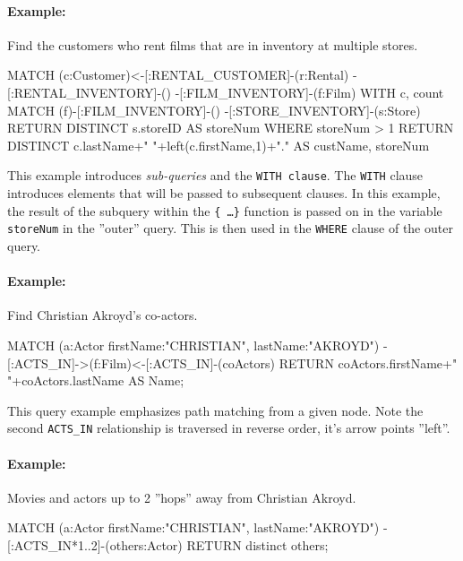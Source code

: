 \paragraph*{Example:} Find the customers who rent films that are in inventory at multiple stores.

\begin{samepage}
\begin{cyphercode}
MATCH (c:Customer)<-[:RENTAL_CUSTOMER]-(r:Rental)
       -[:RENTAL_INVENTORY]-()
       -[:FILM_INVENTORY]-(f:Film) 
WITH c, count{ 
  MATCH (f)-[:FILM_INVENTORY]-()
        -[:STORE_INVENTORY]-(s:Store) 
  RETURN DISTINCT s.storeID } AS storeNum
WHERE storeNum > 1
RETURN DISTINCT 
  c.lastName+" "+left(c.firstName,1)+"." AS custName, 
  storeNum
\end{cyphercode}
\end{samepage}

This example introduces \emph{sub-queries} and the \texttt{WITH clause}. The \texttt{WITH} clause introduces elements that will be passed to subsequent clauses. In this example, the result of the subquery within the \texttt{\{ \ldots \}} function is passed on in the variable \texttt{storeNum} in the ''outer'' query. This is then used in the \texttt{WHERE} clause of the outer query.

\paragraph*{Example:} Find Christian Akroyd's co-actors.

\begin{samepage}
\begin{cyphercode}
MATCH (a:Actor {firstName:"CHRISTIAN", lastName:"AKROYD"}) 
      -[:ACTS_IN]->(f:Film)<-[:ACTS_IN]-(coActors) 
RETURN coActors.firstName+" "+coActors.lastName AS Name;
\end{cyphercode}
\end{samepage}

This query example emphasizes path matching from a given node. Note the second \texttt{ACTS\_IN} relationship is traversed in reverse order, it's arrow points ''left''.

\paragraph*{Example:} Movies and actors up to 2 ''hops'' away from Christian Akroyd.

\begin{cyphercode}
MATCH (a:Actor {firstName:"CHRISTIAN", lastName:"AKROYD"})
      -[:ACTS_IN*1..2]-(others:Actor) 
RETURN distinct others;
\end{cyphercode}

